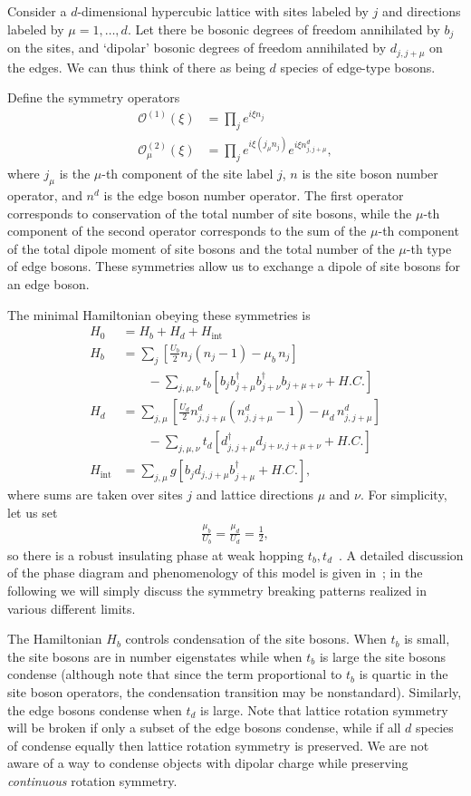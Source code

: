 \documentclass[prb,aps,twocolumn, amsfonts,amsmath,amssymb,nofootinbib,superscriptaddress]{revtex4-2}
\newcommand{\op}[1]{\mathcal{O}^{(#1)}}
\newcommand{\nn}{\nonumber\\}
\begin{document}
Consider a $d$-dimensional hypercubic lattice with sites labeled by $j$ and directions labeled by $\mu = 1,\dots,d$. Let there be bosonic degrees of freedom annihilated by $b_j$ on the sites, and `dipolar' bosonic degrees of freedom annihilated by $d_{j,j+\mu}$ on the edges. We can thus think of there as being $d$ species of edge-type bosons.

Define the symmetry operators
\begin{align}
\op{1}(\xi) &= \prod_je^{i\xi n_j}\nn
\op{2}_\mu(\xi) &= \prod_j e^{i\xi (j_\mu n_j)}e^{i\xi n^d_{j,j+\mu}},
\end{align}
where $j_\mu$ is the $\mu$-th component of the site label $j$, $n$ is the site boson number operator, and $n^d$ is the edge boson number operator.
The first operator corresponds to conservation of the total number of site bosons, while the $\mu$-th component of the second operator corresponds to the sum of the $\mu$-th component of the total dipole moment of site bosons and the total number of the $\mu$-th type of edge bosons. These symmetries allow us to exchange a dipole of site bosons for an edge boson. 

The minimal Hamiltonian obeying these symmetries is  
\begin{align}
H_0  &= H_b + H_d + H_\text{int}\nn
H_b &= \sum_j \left[ \frac{U_b}{2}  n_j (n_j-1) - \mu_b \, n_j \right] \nn
&\qquad - \sum_{j,\mu,\nu} t_b \left[  b_j b^{\dag}_{j+\mu} b^{\dag}_{j+\nu} b_{j+\mu+\nu} + H.C. \right]\nn
H_d &= \sum_{j,\mu} \left[ \frac{U_d}{2} n^d_{j,j+\mu} (n^d_{j,j+\mu} - 1) -\mu_d \, n^d_{j, j + \mu} \right]\nn
&\qquad  - \sum_{j,\mu,\nu} t_d \left[d^{\dag}_{j, j + \mu} d_{j + \nu, j+\mu + \nu} +H.C.\right]\nn
H_\text{int} &= \sum_{j,\mu} g\left[ b_j d_{j,j+\mu} b^\dag_{j+\mu} + H.C. \right],
\end{align}
where sums are taken over sites $j$ and lattice directions $\mu$ and $\nu$.  
For simplicity, let us set 
\begin{align}
\frac{\mu_b}{ U_b} = \frac{\mu_d }{ U_d} = \frac{1}{2},
\end{align}
so there is a robust insulating phase at weak hopping $t_b, t_d$~\cite{Fisheretal}. A detailed discussion of the phase diagram and phenomenology of this model is given in~\cite{dbhm}; in the following we will simply discuss the symmetry breaking patterns realized in various different limits. 

The Hamiltonian $H_b$ controls condensation of the site bosons. When $t_b$ is small, the site bosons are in number eigenstates while when $t_b$ is large the site bosons condense (although note that since the term proportional to $t_b$ is quartic in the site boson operators, the condensation transition may be nonstandard). Similarly, the edge bosons condense when $t_d$ is large. Note that lattice rotation symmetry will be broken if only a subset of the edge bosons condense, while if all $d$ species of condense equally then lattice rotation symmetry is preserved. We are not aware of a way to condense objects with dipolar charge while preserving {\it continuous} rotation symmetry. 
\end{document}
